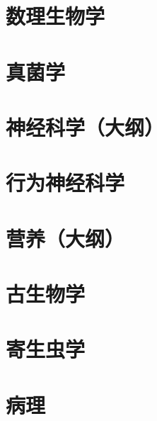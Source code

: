 \documentclass[UTF8]{../NatureUniverse}
\begin{document}
\section{数理生物学}



\section{真菌学}
\section{神经科学（大纲）}
\section{行为神经科学}
\section{营养（大纲）}
\section{古生物学}
\section{寄生虫学}
\section{病理}
\end{document}
